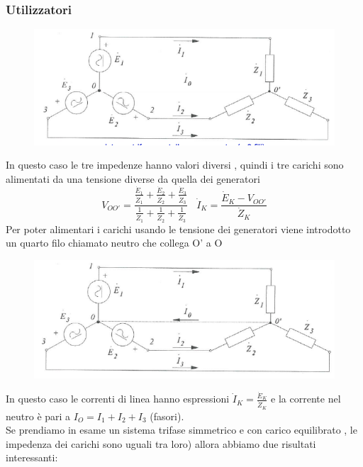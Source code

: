 \documentclass{article}
\theoremstyle{definition}
\begin{document}
\subsubsection{Utilizzatori}
\begin{figure}[h]
	\centering
	\includegraphics[scale=0.40]{"immagini/no neutro"}
	\label{fig:no-neutro}
\end{figure}
In questo caso le tre impedenze hanno valori diversi , quindi i tre carichi sono alimentati da una tensione diverse da quella dei generatori
$$V_{OO'}=\frac{\frac{\dot{E}_1}{\dot{Z}_1}+\frac{\dot{E}_2}{\dot{Z}_2}+\frac{\dot{E}_3}{\dot{Z}_3} }{\frac{1}{\dot{Z}_1}+\frac{1}{\dot{Z}_2}+\frac{1}{\dot{Z_3}}} \ \ \ \ \dot{I}_K=\frac{\dot{E}_K-V_{OO'}}{\dot{Z}_K}$$
\newpage
Per poter alimentari i carichi usando le tensione dei generatori viene introdotto un quarto filo chiamato neutro che collega O' a O 
\begin{figure}[h]
    \centering
    \includegraphics[scale=0.40]{immagini/neutro.png}
    \label{fig:enter-label}
\end{figure}
In questo caso le correnti di linea hanno espressioni $\dot{I}_K=\frac{\dot{E}_K}{\dot{Z}_K}$ e la corrente nel neutro è pari a $I_O=I_1+I_2+I_3$ (fasori).\\
Se prendiamo in esame un sistema trifase simmetrico e con carico equilibrato , le impedenza dei carichi sono uguali tra loro) allora abbiamo due risultati interessanti:
\end{document}
